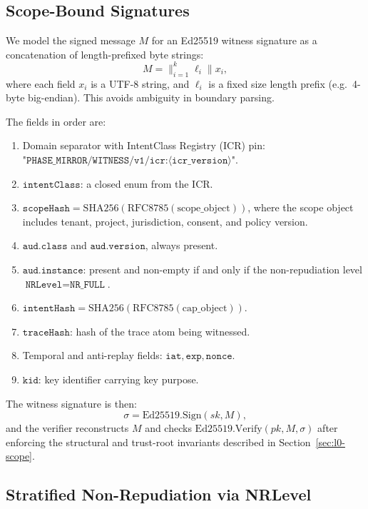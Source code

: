 \documentclass[11pt]{article}
\begin{document}
\subsection{Scope-Bound Signatures}

We model the signed message \(M\) for an Ed25519 witness signature as
a concatenation of length-prefixed byte strings:
\[
  M = \bigl\|_{i=1}^k \ell_i \parallel x_i,
\]
where each field \(x_i\) is a UTF-8 string, and \(\ell_i\) is a fixed
size length prefix (e.g.\ 4-byte big-endian). This avoids ambiguity
in boundary parsing.

The fields in order are:

\begin{enumerate}[label=(\roman*)]
  \item Domain separator with IntentClass Registry (ICR) pin:
        \(\texttt{"PHASE\_MIRROR/WITNESS/v1/icr:}\langle \texttt{icr\_version}\rangle\texttt{"}\).
  \item \(\texttt{intentClass}\): a closed enum from the ICR.
  \item \(\texttt{scopeHash} = \text{SHA256}(\text{RFC8785}(\text{scope\_object}))\),
        where the scope object includes tenant, project, jurisdiction,
        consent, and policy version.
  \item \(\texttt{aud.class}\) and \(\texttt{aud.version}\), always present.
  \item \(\texttt{aud.instance}\): present and non-empty if and only if
        the non-repudiation level \( \texttt{NRLevel} = \texttt{NR\_FULL} \).
  \item \(\texttt{intentHash} = \text{SHA256}(\text{RFC8785}(\text{cap\_object}))\).
  \item \(\texttt{traceHash}\): hash of the trace atom being witnessed.
  \item Temporal and anti-replay fields: \(\texttt{iat}, \texttt{exp}, \texttt{nonce}\).
  \item \(\texttt{kid}\): key identifier carrying key purpose.
\end{enumerate}

The witness signature is then:
\[
  \sigma = \text{Ed25519.Sign}(sk, M),
\]
and the verifier reconstructs \(M\) and checks
\(\text{Ed25519.Verify}(pk, M, \sigma)\) after enforcing the structural
and trust-root invariants described in Section~\ref{sec:l0-scope}.

\subsection{Stratified Non-Repudiation via NRLevel}
\end{document}
